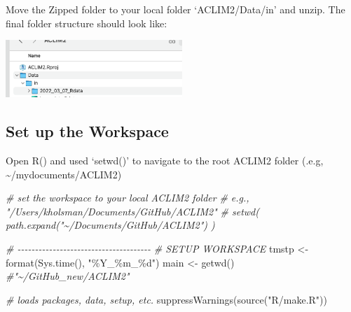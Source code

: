 \documentclass[
]{article}
\newenvironment{Shaded}{\begin{snugshade}}{\end{snugshade}}
\newcommand{\CommentTok}[1]{\textcolor[rgb]{0.56,0.35,0.01}{\textit{#1}}}
\newcommand{\FunctionTok}[1]{\textcolor[rgb]{0.00,0.00,0.00}{#1}}
\newcommand{\NormalTok}[1]{#1}
\newcommand{\OtherTok}[1]{\textcolor[rgb]{0.56,0.35,0.01}{#1}}
\newcommand{\StringTok}[1]{\textcolor[rgb]{0.31,0.60,0.02}{#1}}
\begin{document}
Move the Zipped folder to your local folder `ACLIM2/Data/in' and unzip.
The final folder structure should look like:

\includegraphics[width=0.5\textwidth,height=\textheight]{Figs/DATA_dir.png}

\hypertarget{set-up-the-workspace}{%
\subsection{Set up the Workspace}\label{set-up-the-workspace}}

Open R() and used `setwd()' to navigate to the root ACLIM2 folder (.e.g,
\textasciitilde/mydocuments/ACLIM2)

\begin{Shaded}
\begin{Highlighting}[]
    \CommentTok{\# set the workspace to your local ACLIM2 folder}
    \CommentTok{\# e.g., "/Users/kholsman/Documents/GitHub/ACLIM2"}
    \CommentTok{\# setwd( path.expand("\textasciitilde{}/Documents/GitHub/ACLIM2") )}
   
    \CommentTok{\# {-}{-}{-}{-}{-}{-}{-}{-}{-}{-}{-}{-}{-}{-}{-}{-}{-}{-}{-}{-}{-}{-}{-}{-}{-}{-}{-}{-}{-}{-}{-}{-}{-}{-}{-}{-}{-}{-}}
    \CommentTok{\# SETUP WORKSPACE}
\NormalTok{    tmstp  }\OtherTok{\textless{}{-}} \FunctionTok{format}\NormalTok{(}\FunctionTok{Sys.time}\NormalTok{(), }\StringTok{"\%Y\_\%m\_\%d"}\NormalTok{)}
\NormalTok{    main   }\OtherTok{\textless{}{-}} \FunctionTok{getwd}\NormalTok{()  }\CommentTok{\#"\textasciitilde{}/GitHub\_new/ACLIM2"}
    
    \CommentTok{\# loads packages, data, setup, etc.}
    \FunctionTok{suppressWarnings}\NormalTok{(}\FunctionTok{source}\NormalTok{(}\StringTok{"R/make.R"}\NormalTok{))}
\end{Highlighting}
\end{Shaded}
\end{document}
